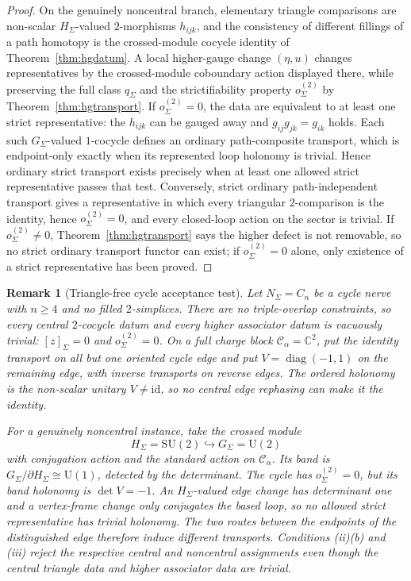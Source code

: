 \documentclass[11pt]{article}
\newtheorem{remark}[theorem]{Remark}
\newcommand{\SU}{\mathrm{SU}}
\newcommand{\U}{\mathrm{U}}
\begin{document}
\begin{proof}
On the genuinely noncentral branch, elementary triangle comparisons are non-scalar
\(H_\Sigma\)-valued \(2\)-morphisms \(h_{ijk}\), and the consistency of different fillings of a
path homotopy is the crossed-module cocycle identity of Theorem~\ref{thm:hgdatum}. A local
higher-gauge change \((\eta,u)\) changes representatives by the crossed-module coboundary action
displayed there, while preserving the full class \(q_\Sigma\) and the strictifiability property
\(o^{(2)}_\Sigma\) by Theorem~\ref{thm:hgtransport}. If
\(o^{(2)}_\Sigma=0\), the data are equivalent to at least one strict representative: the
\(h_{ijk}\) can be gauged away and \(g_{ij}g_{jk}=g_{ik}\) holds. Each such
\(G_\Sigma\)-valued \(1\)-cocycle defines an ordinary path-composite transport, which is
endpoint-only exactly when its represented loop holonomy is trivial. Hence ordinary strict
transport exists precisely when at least one allowed strict representative passes that test.
Conversely, strict ordinary path-independent transport gives a representative
in which every triangular \(2\)-comparison is the identity, hence \(o^{(2)}_\Sigma=0\), and every
closed-loop action on the sector is trivial. If \(o^{(2)}_\Sigma\ne0\),
Theorem~\ref{thm:hgtransport} says the higher defect is not removable, so no strict ordinary
transport functor can exist; if \(o^{(2)}_\Sigma=0\) alone, only existence of a strict
representative has been proved.
\end{proof}

\begin{remark}[Triangle-free cycle acceptance test]\label{rem:transport-cycle-test}
Let \(N_\Sigma=C_n\) be a cycle nerve with \(n\ge4\) and no filled \(2\)-simplices. There are no
triple-overlap constraints, so every central \(2\)-cocycle datum and every higher associator datum
is vacuously trivial: \([z]_\Sigma=0\) and \(o^{(2)}_\Sigma=0\). On a full charge block
\(\mathcal C_\alpha=\mathbb C^2\), put the identity transport on all but one oriented cycle edge
and put \(V=\operatorname{diag}(-1,1)\) on the remaining edge, with inverse transports on reverse
edges. The ordered holonomy is the non-scalar unitary \(V\ne\mathrm{id}\), so no central edge
rephasing can make it the identity.

For a genuinely noncentral instance, take the crossed module
\[
H_\Sigma=\SU(2)\hookrightarrow G_\Sigma=\U(2)
\]
with conjugation action and the standard action on \(\mathcal C_\alpha\). Its band is
\(G_\Sigma/\partial H_\Sigma\cong\U(1)\), detected by the determinant. The cycle has
\(o^{(2)}_\Sigma=0\), but its band holonomy is
\(\det V=-1\). An \(H_\Sigma\)-valued edge change has determinant one and a vertex-frame change
only conjugates the based loop, so no allowed strict representative has trivial holonomy. The two
routes between the endpoints of the distinguished edge therefore induce different transports.
Conditions \textup{(ii)(b)} and \textup{(iii)} reject the respective central and noncentral
assignments even though the central triangle data and higher associator data are trivial.
\end{remark}
\end{document}
